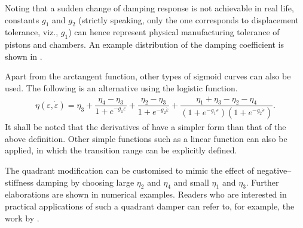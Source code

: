 Noting that a sudden change of damping response is not achievable in real life, constants $g_1$ and $g_2$ (strictly speaking, only the one corresponds to displacement tolerance, viz., $g_1$) can hence represent physical manufacturing tolerance of pistons and chambers. An example distribution of the damping coefficient is shown in .

Apart from the arctangent function, other types of sigmoid curves can also be used. The following is an alternative using the logistic function.
\begin{gather}
\eta\left(\varepsilon,\dot\varepsilon\right)=\eta_3+\dfrac{\eta_4-\eta_3}{1+e^{-g_1\varepsilon}}+\dfrac{\eta_2-\eta_3}{1+e^{-g_2\dot{\varepsilon}}}+\dfrac{\eta_1+\eta_3-\eta_2-\eta_4}{\left(1+e^{-g_1\varepsilon}\right)\left(1+e^{-g_2\dot{\varepsilon}}\right)}.
\end{gather}
It shall be noted that the derivatives of  have a simpler form than that of the above definition. Other simple functions such as a linear function can also be applied, in which the transition range can be explicitly defined.

The quadrant modification can be customised to mimic the effect of negative--stiffness damping \citep[see][]{Iemura2009,Hoegsberg2011,Zhou2015,Javanbakht2018} by choosing large $\eta_2$ and $\eta_4$ and small $\eta_1$ and $\eta_3$. Further elaborations are shown in numerical examples. Readers who are interested in practical applications of such a quadrant damper can refer to, for example, the work by \citet{Hazaveh2017}.
